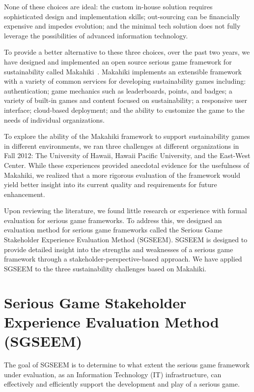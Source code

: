 \documentclass{sigchi}
\begin{document}
None of these choices are ideal: the custom in-house solution requires
sophisticated design and implementation skills; out-sourcing can be
financially expensive and impedes evolution; and the minimal tech
solution does not fully leverage the possibilities of advanced
information technology.

To provide a better alternative to these three choices, over the past
two years, we have designed and implemented an open source serious
game framework for sustainability called Makahiki~\cite{csdl2-12-06}.
Makahiki implements an extensible framework with a
variety of common services for developing sustainability games
including: authentication; game mechanics such as leaderboards, points,
and badges; a variety of built-in games and content focused on
sustainability; a responsive user interface; cloud-based deployment;
and the ability to customize the game to the needs of individual
organizations.

To explore the ability of the Makahiki framework to support
sustainability games in different environments, we ran three
challenges at different organizations in Fall 2012: The University of
Hawaii, Hawaii Pacific University, and the East-West Center. While
these experiences provided anecdotal evidence for the usefulness of
Makahiki, we realized that a more rigorous evaluation of the framework
would yield better insight into its current quality and requirements
for future enhancement.

Upon reviewing the literature, we found little research or experience
with formal evaluation for serious game frameworks. To address this, we
designed an evaluation method for serious game frameworks called the
Serious Game Stakeholder Experience Evaluation Method (SGSEEM). SGSEEM
is designed to provide detailed insight into the strengths and
weaknesses of a serious game framework through a
stakeholder-perspective-based approach. We have applied SGSEEM to the
three sustainability challenges based on Makahiki.

\section{Serious Game Stakeholder Experience Evaluation Method (SGSEEM)}

The goal of SGSEEM is to determine to what extent the serious game
framework under evaluation, as an Information Technology (IT)
infrastructure, can effectively and efficiently support the
development and play of a serious game.
\end{document}
